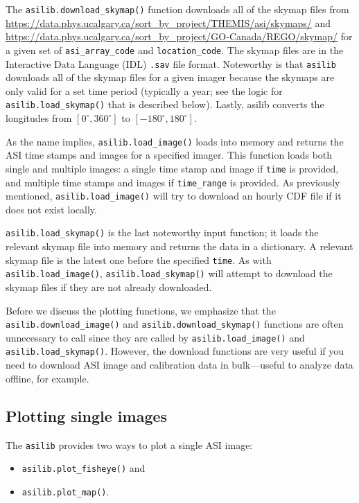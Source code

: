 \documentclass[draft]{agujournal2019}
\begin{document}
The \verb|asilib.download_skymap()| function downloads all of the skymap files from \url{https://data.phys.ucalgary.ca/sort_by_project/THEMIS/asi/skymaps/} and \url{https://data.phys.ucalgary.ca/sort_by_project/GO-Canada/REGO/skymap/} for a given set of \verb|asi_array_code| and \verb|location_code|. The skymap files are in the Interactive Data Language (IDL) \verb|.sav| file format. Noteworthy is that \verb|asilib| downloads all of the skymap files for a given imager because the skymaps are only valid for a set time period (typically a year; see the logic for \verb|asilib.load_skymap()| that is described below). Lastly, asilib converts the longitudes from $[0^\circ, 360^\circ]$ to $[-180^\circ, 180^\circ]$.

As the name implies, \verb|asilib.load_image()| loads into memory and returns the ASI time stamps and images for a specified imager. This function loads both single and multiple images: a single time stamp and image if \verb|time| is provided, and multiple time stamps and images if \verb|time_range| is provided. As previously mentioned, \verb|asilib.load_image()| will try to download an hourly CDF file if it does not exist locally.

\verb|asilib.load_skymap()| is the last noteworthy input function; it loads the relevant skymap file into memory and returns the data in a dictionary. A relevant skymap file is the latest one before the specified \verb|time|. As with \verb|asilib.load_image()|, \verb|asilib.load_skymap()| will attempt to download the skymap files if they are not already downloaded.

Before we discuss the plotting functions, we emphasize that the \verb|asilib.download_image()| and \verb|asilib.download_skymap()| functions are often unnecessary to call since they are called by \verb|asilib.load_image()| and \verb|asilib.load_skymap()|. However, the download functions are very useful if you need to download ASI image and calibration data in bulk---useful to analyze data offline, for example.

\subsection{Plotting single images}

The \verb|asilib| provides two ways to plot a single ASI image:

\begin{itemize}
      \item \verb|asilib.plot_fisheye()| and
      \item \verb|asilib.plot_map()|.
\end{itemize}
\end{document}
